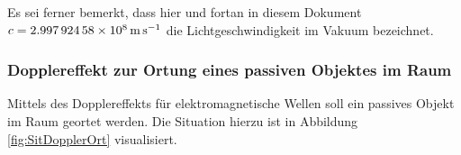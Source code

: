 \documentclass[a4paper,12pt]{article}
\numberwithin{equation}{section}
\begin{document}
Es sei ferner bemerkt, dass hier und fortan in diesem Dokument $c = \SI{2.99792458E8}{\meter\per\second}$ die Lichtgeschwindigkeit im Vakuum bezeichnet.

\subsubsection{Dopplereffekt zur Ortung eines passiven Objektes im Raum}
Mittels des Dopplereffekts für elektromagnetische Wellen soll ein passives Objekt im Raum geortet werden. Die Situation hierzu ist in Abbildung \ref{fig:SitDopplerOrt} visualisiert. 
\begin{figure}[h]
\centering



\begin{tikzpicture}[x=0.75pt,y=0.75pt,yscale=-1,xscale=1]


\end{tikzpicture}
\end{figure}
\end{document}
